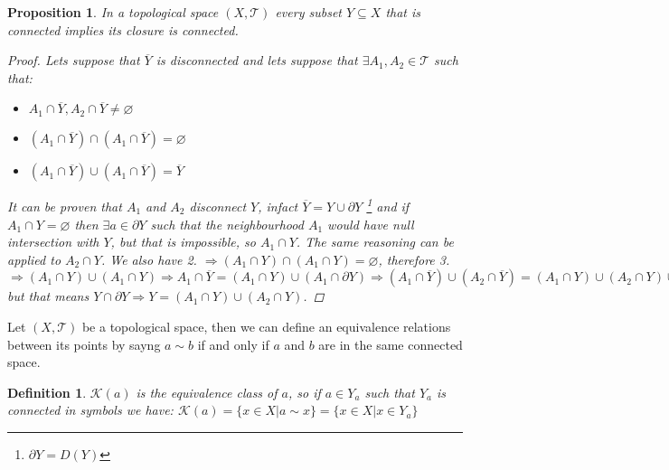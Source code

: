 \documentclass{article}
\newtheorem{proposition}{Proposition}
\newtheorem{definition}{Definition}
\begin{document}
            \begin{proposition}
                In a topological space $(X, \mathcal{T})$ every subset $Y \subseteq X$ that is connected implies its closure is connected.
                \begin{proof}
                    Lets suppose that $\overline{Y}$ is disconnected and lets suppose that $\exists A_1,A_2 \in \mathcal{T}$ such that:
                    \begin{itemize}
                        \item[1.] $A_1 \cap \overline{Y}, A_2 \cap \overline{Y} \neq \varnothing$
                        \item[2.] $\left( A_1 \cap \overline{Y} \right) \cap \left( A_1 \cap \overline{Y} \right) = \varnothing$
                        \item[3.] $\left( A_1 \cap \overline{Y} \right) \cup \left( A_1 \cap \overline{Y} \right) = \overline{Y}$   
                    \end{itemize}
                    It can be proven that $A_1$ and $A_2$ disconnect $Y$, infact $\overline{Y} = Y \cup \partial Y$ \footnote{$\partial Y = D(Y)$} and if $A_1 \cap Y = \varnothing$ then $\exists a \in \partial Y$ such that the neighbourhood $A_1$ would have null intersection with $Y$, but that is impossible,
                    so $A_1 \cap Y$. The same reasoning can be applied to $A_2 \cap Y$. We also have 2. $\Rightarrow \left( A_1 \cap Y \right) \cap \left( A_1 \cap Y \right) = \varnothing$, therefore 3. $\Rightarrow \left( A_1 \cap Y \right) \cup \left( A_1 \cap Y \right) \Rightarrow A_1 \cap \overline{Y} = \left( A_1 \cap Y \right) \cup \left( A_1 \cap \partial Y \right) \Rightarrow \left( A_1 \cap \overline{Y} \right) \cup \left( A_2 \cap \overline{Y} \right) = \left( A_1 \cap Y \right) \cup \left( A_2 \cap Y \right) \cup \left( \left( A_1 \cup A_2 \right) \cap \partial Y \right)$ but that means $Y \cap \partial Y \Rightarrow Y = \left( A_1 \cap Y \right) \cup \left( A_2 \cap Y \right)$.
                \end{proof}
            \end{proposition}        
                Let $(X,\mathcal{T})$ be a topological space, then we can define an equivalence relations between its points by sayng $a \sim b$ if and only if $a$ and $b$ are in the same connected space.  
            \begin{definition}
                $\mathcal{K}(a)$ is the equivalence class of $a$, so if $a \in Y_a$ such that $Y_a$ is connected in symbols we have: $\mathcal{K}(a) = \{ x \in X | a \sim x \} = \{ x \in X| x \in Y_a\}$
            \end{definition}
\end{document}
